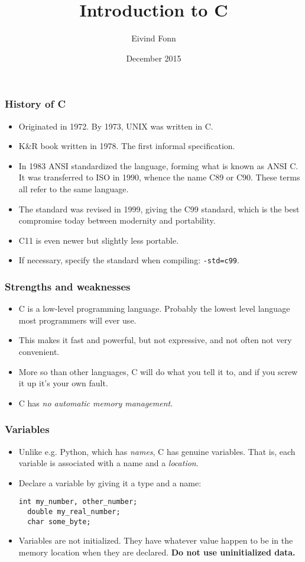 

\title{Introduction to C}
\author{Eivind Fonn}
\date{December 2015}
\maketitle

\begin{frame}
  \frametitle{History of C}
  \begin{itemize}
  \item Originated in 1972. By 1973, UNIX was written in C.
  \item K\&R book written in 1978. The first informal specification.
  \item In 1983 ANSI standardized the language, forming what is known as ANSI C.
    It was transferred to ISO in 1990, whence the name C89 or C90. These terms
    all refer to the same language.
  \item The standard was revised in 1999, giving the C99 standard, which is the
    best compromise today between modernity and portability.
  \item C11 is even newer but slightly less portable.
  \item If necessary, specify the standard when compiling: \texttt{-std=c99}.
  \end{itemize}
\end{frame}

\begin{frame}
  \frametitle{Strengths and weaknesses}
  \begin{itemize}
  \item C is a low-level programming language. Probably the lowest level
    language most programmers will ever use.
  \item This makes it fast and powerful, but not expressive, and not often not
    very convenient.
  \item More so than other languages, C will do what you tell it to, and if you
    screw it up it's your own fault.
  \item C has \emph{no automatic memory management}.
  \end{itemize}
\end{frame}

\begin{frame}[fragile]
  \frametitle{Variables}
  \begin{itemize}
  \item Unlike e.g. Python, which has \emph{names}, C has genuine variables.
    That is, each variable is associated with a name and a \emph{location}.
  \item Declare a variable by giving it a type and a name:
\begin{lstlisting}[style=c]
  int my_number, other_number;
  double my_real_number;
  char some_byte;
\end{lstlisting}
  \item Variables are not initialized. They have whatever value happen to be in
    the memory location when they are declared. \textbf{Do not use uninitialized
      data.}
  \end{itemize}
\end{frame}

